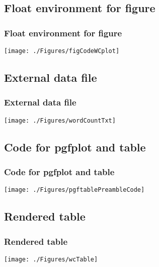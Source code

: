 \documentclass{beamer}
\begin{document}
\subsection{Float environment for figure}
\begin{frame}
\frametitle{Float environment for figure}
\begin{center}
\begin{center}
    \texttt{[image: ./Figures/figCodeWCplot]}
\end{center}
\end{center}
\end{frame}
\note{}


\subsection{External data file}
\begin{frame}
\frametitle{External data file}
\begin{center}
\begin{center}
    \texttt{[image: ./Figures/wordCountTxt]}
\end{center}
\end{center}
\end{frame}
\note{}


\subsection{Code for pgfplot and table}
\begin{frame}
\frametitle{Code for pgfplot and table}
\begin{center}
\begin{center}
    \texttt{[image: ./Figures/pgftablePreambleCode]}
\end{center}
\end{center}
\end{frame}
\note{}


\subsection{Rendered table}
\begin{frame}
\frametitle{Rendered table}
\begin{center}
\begin{center}
    \texttt{[image: ./Figures/wcTable]}
\end{center}
\end{center}
\end{frame}
\note{}
\end{document}
